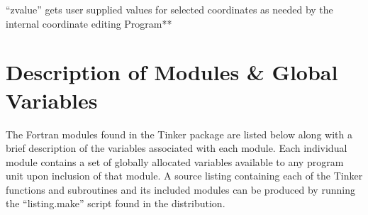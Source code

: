 \documentclass[letterpaper,11pt,english]{sphinxmanual}
\begin{document}

“zvalue” gets user supplied values for selected coordinates as needed by the internal coordinate editing Program**


\chapter{Description of Modules \& Global Variables}
\label{\detokenize{text/modules:description-of-modules-global-variables}}\label{\detokenize{text/modules::doc}}
The Fortran modules found in the Tinker package are listed below along with a brief description of the variables associated with each module. Each individual module contains a set of globally allocated variables available to any program unit upon inclusion of that module. A source listing containing each of the Tinker functions and subroutines and its included modules can be produced by running the “listing.make” script found in the distribution.
\end{document}
